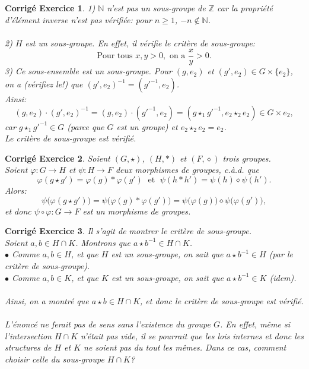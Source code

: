 \documentclass[11pt,french,table]{article}
\theoremstyle{exercice}
\theoremstyle{corrigé}
\newtheorem{corrigé}{Corrigé Exercice}
\begin{document}
\vspace{2em}
\begin{corrigé}
1) $\mathbb{N}$ n'est pas un sous-groupe de $\mathbb{Z}$ car la propriété d'élément inverse n'est pas vérifiée: pour $n \geq 1$, $-n \notin \mathbb{N}$. \\ \\
2) $H$ est un sous-groupe. En effet, il vérifie le critère de sous-groupe:
$$\text{Pour tous } x,y >0, \text{ on a } \dfrac{x}{y} > 0.$$
3) Ce sous-ensemble est un sous-groupe. Pour $(g,e_2)$ et $(g',e_2) \in G \times \{e_2\}$, on a (vérifiez le!) que $(g',e_2)^{-1} = (g'^{-1},e_2)$. \\
Ainsi:
$$(g,e_2) \cdot (g',e_2)^{-1} = (g,e_2) \cdot (g'^{-1},e_2) = (g \star_1 g'^{-1},e_2 \star_2 e_2) \in G \times {e_2},$$
car $g \star_1 g'^{-1} \in G$ (parce que $G$ est un groupe) et $e_2 \star_2 e_2 = e_2$. \\
Le critère de sous-groupe est vérifié.
\end{corrigé}
\vspace{2em}
\begin{corrigé}
Soient $(G, \star)$, $(H,*)$ et $(F, \diamond )$ trois groupes. \\
Soient $\varphi: G \longrightarrow H$ et $\psi : H \longrightarrow F$ deux morphismes de groupes, c.à.d. que $$\varphi( g \star g') = \varphi(g) * \varphi(g') \; \text{ et } \; \psi(h * h') = \psi(h) \diamond \psi(h').$$
Alors: 
$$\psi \big( \varphi(g \star g') \big) = \psi \big( \varphi(g) * \varphi(g') \big) = \psi \big( \varphi(g) \big) \diamond \psi \big( \varphi(g') \big),$$
et donc $\psi \circ \varphi : G \longrightarrow F$ est un morphisme de groupes.
\end{corrigé}
\vspace{2em}
\begin{corrigé}
Il s'agit de montrer le critère de sous-groupe. \\
Soient $a,b \in H \cap K$. Montrons que $a \star b^{-1} \in H \cap K$. \pagebreak \\
$\bullet$ Comme $a,b \in H$, et que $H$ est un sous-groupe, on sait que $a \star b^{-1} \in H$ (par le critère de sous-groupe). \\
$\bullet$ Comme $a,b \in K$, et que $K$ est un sous-groupe, on sait que $a \star b^{-1} \in K$ (idem). \\ 
\\
Ainsi, on a montré que $a \star b \in H \cap K$, et donc le critère de sous-groupe est vérifié. \\
\\
L'énoncé ne ferait pas de sens sans l'existence du groupe $G$. En effet, même si l'intersection $H \cap K$ n'était pas vide, il se pourrait que les lois internes et donc les structures de $H$ et $K$ ne soient pas du tout les mêmes. Dans ce cas, comment choisir celle du sous-groupe $H \cap K$?
\end{corrigé}
\end{document}
